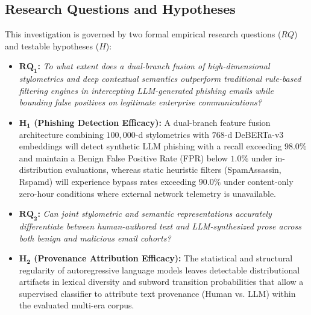 \documentclass[journal]{IEEEtran}
\begin{document}
\subsection{Research Questions and Hypotheses}
This investigation is governed by two formal empirical research questions ($RQ$) and testable hypotheses ($H$):
\begin{itemize}
    \item \textbf{$\mathbf{RQ_1}$:} \emph{To what extent does a dual-branch fusion of high-dimensional stylometrics and deep contextual semantics outperform traditional rule-based filtering engines in intercepting LLM-generated phishing emails while bounding false positives on legitimate enterprise communications?}
    \item \textbf{$\mathbf{H_1}$ (Phishing Detection Efficacy):} A dual-branch feature fusion architecture combining $100,000$-d stylometrics with $768$-d DeBERTa-v3 embeddings will detect synthetic LLM phishing with a recall exceeding $98.0\%$ and maintain a Benign False Positive Rate (FPR) below $1.0\%$ under in-distribution evaluations, whereas static heuristic filters (SpamAssassin, Rspamd) will experience bypass rates exceeding $90.0\%$ under content-only zero-hour conditions where external network telemetry is unavailable.
    \item \textbf{$\mathbf{RQ_2}$:} \emph{Can joint stylometric and semantic representations accurately differentiate between human-authored text and LLM-synthesized prose across both benign and malicious email cohorts?}
    \item \textbf{$\mathbf{H_2}$ (Provenance Attribution Efficacy):} The statistical and structural regularity of autoregressive language models leaves detectable distributional artifacts in lexical diversity and subword transition probabilities that allow a supervised classifier to attribute text provenance (Human vs. LLM) within the evaluated multi-era corpus.
\end{itemize}
\end{document}
